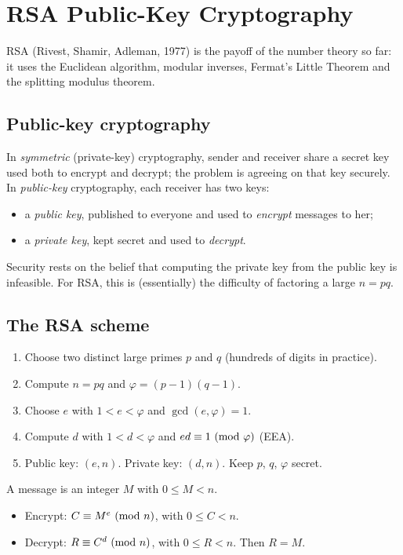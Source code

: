 \chapter{RSA Public-Key Cryptography}

RSA (Rivest, Shamir, Adleman, 1977) is the payoff of the number theory so far: it uses the
Euclidean algorithm, modular inverses, Fermat's Little Theorem and the splitting modulus
theorem.

\section{Public-key cryptography}

In \emph{symmetric} (private-key) cryptography, sender and receiver share a secret key used
both to encrypt and decrypt; the problem is agreeing on that key securely. In
\emph{public-key} cryptography, each receiver has two keys:
\begin{itemize}
  \item a \emph{public key}, published to everyone and used to \emph{encrypt} messages to her;
  \item a \emph{private key}, kept secret and used to \emph{decrypt}.
\end{itemize}
Security rests on the belief that computing the private key from the public key is
infeasible. For RSA, this is (essentially) the difficulty of factoring a large $n = pq$.

\section{The RSA scheme}

\begin{important}
\begin{enumerate}
  \item Choose two distinct large primes $p$ and $q$ (hundreds of digits in practice).
  \item Compute $n = pq$ and $\varphi = (p-1)(q-1)$.
  \item Choose $e$ with $1 < e < \varphi$ and $\gcd(e,\varphi) = 1$.
  \item Compute $d$ with $1 < d < \varphi$ and $ed \equiv 1 \ (\mathrm{mod}\ \varphi)$ (EEA).
  \item Public key: $(e, n)$. Private key: $(d, n)$. Keep $p$, $q$, $\varphi$ secret.
\end{enumerate}
\end{important}

\begin{important}
A message is an integer $M$ with $0 \le M < n$.
\begin{itemize}
  \item Encrypt: $C \equiv M^e \ (\mathrm{mod}\ n)$, with $0 \le C < n$.
  \item Decrypt: $R \equiv C^d \ (\mathrm{mod}\ n)$, with $0 \le R < n$. Then $R = M$.
\end{itemize}
\end{important}

